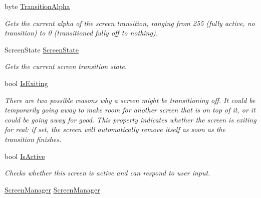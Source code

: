 \begin{DoxyCompactItemize}
byte \hyperlink{classCityMania_1_1TEMP_1_1GUI_a950bc5d9d92d045af5678505d69a093b}{TransitionAlpha}
\begin{DoxyCompactList}\small\item\em Gets the current alpha of the screen transition, ranging from 255 (fully active, no transition) to 0 (transitioned fully off to nothing). \item\end{DoxyCompactList}\item 
ScreenState \hyperlink{classCityMania_1_1TEMP_1_1GUI_ab17acbc6021aebb97197d8c162634f0e}{ScreenState}
\begin{DoxyCompactList}\small\item\em Gets the current screen transition state. \item\end{DoxyCompactList}\item 
bool \hyperlink{classCityMania_1_1TEMP_1_1GUI_a5ed6f265759f7b180e6b8774fedb71b5}{IsExiting}
\begin{DoxyCompactList}\small\item\em There are two possible reasons why a screen might be transitioning off. It could be temporarily going away to make room for another screen that is on top of it, or it could be going away for good. This property indicates whether the screen is exiting for real: if set, the screen will automatically remove itself as soon as the transition finishes. \item\end{DoxyCompactList}\item 
bool \hyperlink{classCityMania_1_1TEMP_1_1GUI_a7467928ea1b1170ed3f96778300d0620}{IsActive}
\begin{DoxyCompactList}\small\item\em Checks whether this screen is active and can respond to user input. \item\end{DoxyCompactList}\item 
\hyperlink{classCityMania_1_1TEMP_1_1ScreenManager}{ScreenManager} \hyperlink{classCityMania_1_1TEMP_1_1GUI_acf9604498f35aa0bc54fc0c6fedbb52a}{ScreenManager}

\end{DoxyCompactItemize}
